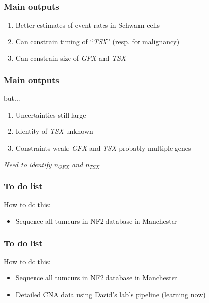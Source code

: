 \documentclass{beamer}
\begin{document}
\begin{frame}
    \frametitle{Main outputs}
    \begin{enumerate}
        \item Better estimates of event rates in Schwann cells
        \item Can constrain timing of ``\emph{TSX}'' (resp. for malignancy)
        \item Can constrain size of \emph{GFX} and \emph{TSX}
    \end{enumerate}
\end{frame}

\begin{frame}
    \frametitle{Main outputs}
    but...
    \begin{enumerate}
        \item Uncertainties still large
        \item Identity of \emph{TSX} unknown
        \item Constraints weak: \emph{GFX} and \emph{TSX} probably multiple genes
    \end{enumerate}

    \;


    \begin{center}
        \emph{Need to identify $n_{GFX}$ and $n_{TSX}$}
    \end{center}
\end{frame}

\begin{frame}
    \frametitle{To do list}

    How to do this:
    \begin{itemize}
        \item Sequence all tumours in NF2 database in Manchester
    \end{itemize}

    \;

\end{frame}
\begin{frame}
    \frametitle{To do list}

    How to do this:
    \begin{itemize}
        \item Sequence all tumours in NF2 database in Manchester
        \item Detailed CNA data using David's lab's pipeline (learning now)
    \end{itemize}

    \;

\end{frame}
\end{document}
